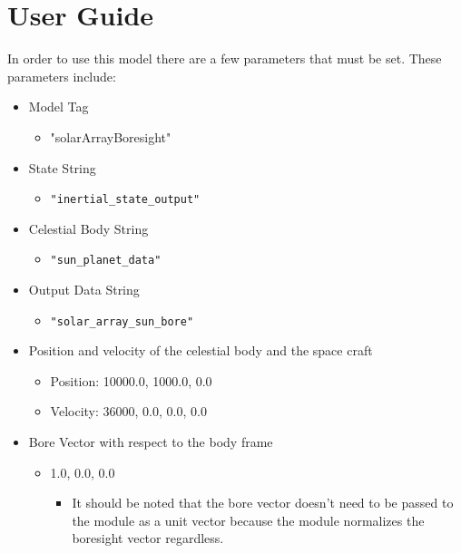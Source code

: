 \section{User Guide}

In order to use this model there are a few parameters that must be set. These parameters include:
\begin{itemize}
\item Model Tag 
	\begin{itemize}
	\item "solarArrayBoresight"
	\end{itemize}
\item State String
	\begin{itemize}
	\item\texttt{"inertial\_state\_output"}
	\end{itemize}
\item Celestial Body String 
	\begin{itemize}
	\item\texttt{"sun\_planet\_data"
}	\end{itemize}
\item Output Data String 
	\begin{itemize}
	\item\texttt{"solar\_array\_sun\_bore"}
	\end{itemize}
\item Position and velocity of the celestial body and the space craft
	\begin{itemize}
	\item Position: 10000.0, 1000.0, 0.0
    \item Velocity: 36000, 0.0, 0.0, 0.0
	\end{itemize}
\item Bore Vector with respect to the body frame
	\begin{itemize}
	\item 1.0, 0.0, 0.0
    	\begin{itemize}
    	\item{It should be noted that the bore vector doesn't need to be passed to the module as a unit vector because the module normalizes the boresight vector regardless. }
		\end{itemize}
    \end{itemize}
\end{itemize}
